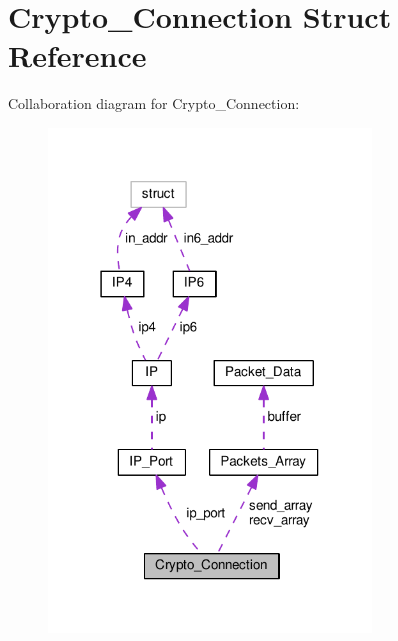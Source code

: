 \hypertarget{struct_crypto___connection}{\section{Crypto\+\_\+\+Connection Struct Reference}
\label{struct_crypto___connection}
}


Collaboration diagram for Crypto\+\_\+\+Connection\+:
\nopagebreak
\begin{figure}[H]
\begin{center}
\leavevmode
\includegraphics[width=243pt]{struct_crypto___connection__coll__graph}
\end{center}
\end{figure}
